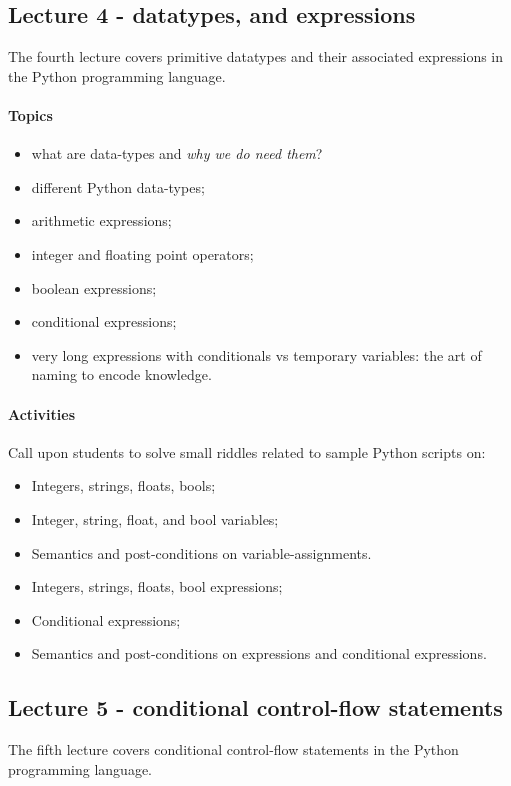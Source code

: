 			\subsection{Lecture 4 - datatypes, and expressions}
				The fourth lecture covers primitive datatypes and their associated expressions in the Python programming language.

				\paragraph*{Topics}
					\begin{itemize}
						\item what are data-types and \textit{why we do need them}?
						\item different Python data-types;
						\item arithmetic expressions;
						\item integer and floating point operators;
						\item boolean expressions;
						\item conditional expressions;
						\item very long expressions with conditionals vs temporary variables: the art of naming to encode knowledge.
					\end{itemize}

				\paragraph*{Activities}
					Call upon students to solve small riddles related to sample Python scripts on:

					\begin{itemize}
						\item Integers, strings, floats, bools;
						\item Integer, string, float, and bool variables;
						\item Semantics and post-conditions on variable-assignments.
						\item Integers, strings, floats, bool expressions;
						\item Conditional expressions;
						\item Semantics and post-conditions on expressions and conditional expressions.
					\end{itemize}

			\subsection{Lecture 5 - conditional control-flow statements}
				The fifth lecture covers conditional control-flow statements in the Python programming language.

